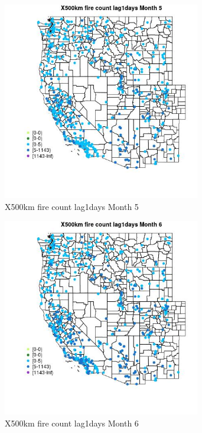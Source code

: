 \begin{figure} 
\centering  
\includegraphics[width=0.77\textwidth]{Code_Outputs/Report_ML_input_PM25_Step4_part_e_de_duplicated_aves_compiled_2019-05-14wNAs_MapObsMo5X500km_fire_count_lag1days.jpg} 
\caption{\label{fig:Report_ML_input_PM25_Step4_part_e_de_duplicated_aves_compiled_2019-05-14wNAsMapObsMo5X500km_fire_count_lag1days}X500km fire count lag1days Month 5} 
\end{figure} 
 

\begin{figure} 
\centering  
\includegraphics[width=0.77\textwidth]{Code_Outputs/Report_ML_input_PM25_Step4_part_e_de_duplicated_aves_compiled_2019-05-14wNAs_MapObsMo6X500km_fire_count_lag1days.jpg} 
\caption{\label{fig:Report_ML_input_PM25_Step4_part_e_de_duplicated_aves_compiled_2019-05-14wNAsMapObsMo6X500km_fire_count_lag1days}X500km fire count lag1days Month 6} 
\end{figure} 
 

